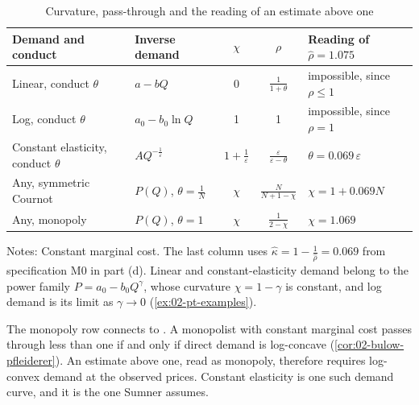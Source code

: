 \begin{table}[htbp]
\centering
\begin{threeparttable}
\caption{Curvature, pass-through and the reading of an estimate above one}
\label{tab:C-curvature}
\small
\begin{tabular}{@{}llccl@{}}
\toprule
Demand and conduct & Inverse demand & $\chi$ & $\rho$ & Reading of $\hat\rho = 1.075$ \\
\midrule
Linear, conduct $\theta$ & $a - bQ$ & 0 & $\frac{1}{1 + \theta}$ & impossible, since $\rho \le 1$ \\
\addlinespace
Log, conduct $\theta$ & $a_0 - b_0\ln Q$ & 1 & 1 & impossible, since $\rho = 1$ \\
\addlinespace
Constant elasticity, conduct $\theta$ & $AQ^{-\frac{1}{\varepsilon}}$ & $1 + \frac{1}{\varepsilon}$ &
  $\frac{\varepsilon}{\varepsilon - \theta}$ & $\theta = 0.069\,\varepsilon$ \\
\addlinespace
Any, symmetric Cournot & $P(Q)$, $\theta = \frac{1}{N}$ & $\chi$ & $\frac{N}{N + 1 - \chi}$ & $\chi = 1 + 0.069N$ \\
\addlinespace
Any, monopoly & $P(Q)$, $\theta = 1$ & $\chi$ & $\frac{1}{2 - \chi}$ & $\chi = 1.069$ \\
\bottomrule
\end{tabular}
\begin{tablenotes}\footnotesize
\item Notes: Constant marginal cost. The last column uses $\hat\kappa = 1 - \frac{1}{\hat\rho} = 0.069$ from
specification M0 in part (d). Linear and constant-elasticity demand belong to the power family
$P = a_0 - b_0Q^{\gamma}$, whose curvature $\chi = 1 - \gamma$ is constant, and log demand is its limit as
$\gamma \to 0$ (\cref{ex:02-pt-examples}).
\end{tablenotes}
\end{threeparttable}
\end{table}

The monopoly row connects to \citet{BulowPfleiderer1983}. A monopolist with constant marginal cost passes through
less than one if and only if direct demand is log-concave (\cref{cor:02-bulow-pfleiderer}). An estimate above one,
read as monopoly, therefore requires log-convex demand at the observed prices. Constant elasticity is one such
demand curve, and it is the one Sumner assumes.

